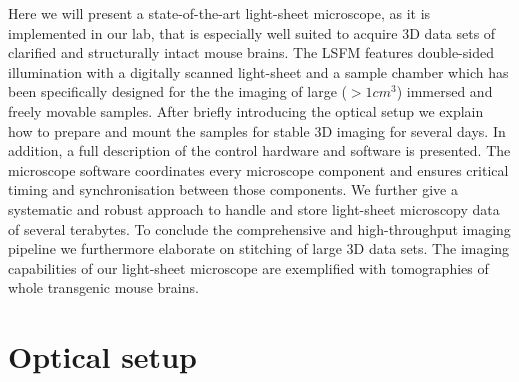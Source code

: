\documentclass[12pt]{spieman}  %
\begin{document}
\begin{spacing}{2}
Here we will present a state-of-the-art light-sheet microscope, as it is implemented in our lab, that is especially well suited to acquire 3D data sets of clarified and structurally intact mouse brains. The LSFM features double-sided illumination with a digitally scanned light-sheet and a sample chamber which has been specifically designed for the the imaging of large ($> 1cm^3$) immersed and freely movable samples. After briefly introducing the optical setup we explain how to prepare and mount the samples for stable 3D imaging for several days. In addition, a full description of the control hardware and software is presented. The microscope software coordinates every microscope component and ensures critical timing and synchronisation between those components. We further give a systematic and robust approach to handle and store light-sheet microscopy data of several terabytes. To conclude the comprehensive and high-throughput imaging pipeline we furthermore elaborate on stitching of large 3D data sets. The imaging capabilities of our light-sheet microscope are exemplified with tomographies of whole transgenic mouse brains.

\section{Optical setup}


\end{spacing}
\end{document}
